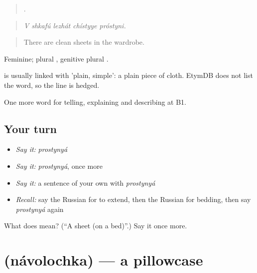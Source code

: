 \begin{quote}
    .
\end{quote}

\begin{quote}
\emph{V shkafú lezhát chístyye próstyni.}
\end{quote}

\begin{quote}
There are clean sheets in the wardrobe.
\end{quote}

Feminine; plural \emph{}, genitive plural \emph{}.

\begin{cousinweb}
\emph{} is usually linked with \emph{} 'plain, simple': a plain piece of cloth. EtymDB does not list the word, so the line is hedged.
\end{cousinweb}

\begin{grammarlens}[title={What you've built}]
One more word for telling, explaining and describing at B1.
\end{grammarlens}

\subsection*{Your turn}
\begin{itemize}
\raggedright
  \item \emph{Say it:} \emph{prostynyá}
  \item \emph{Say it:} \emph{prostynyá}, once more
  \item \emph{Say it:} a sentence of your own with \emph{prostynyá}
  \item \emph{Recall:} say the Russian for to extend, then the Russian for bedding, then say \emph{prostynyá} again
\end{itemize}

\begin{tcolorbox}[breakable,colback=teal!4,colframe=teal!35!black,title={Before you move on}]
What does  mean? (\textquotedblleft{}A sheet (on a bed)\textquotedblright{}.) Say it once more.
\end{tcolorbox}
\section[\texorpdfstring{\ru{наволочка} (návolochka)}{наволочка (návolochka)}]{ (návolochka) — a pillowcase}

